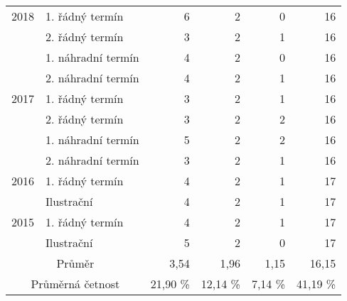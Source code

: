 \begin{table}[htbp]
\begin{tabular}{|l|l|r|r|r|r|}
        \multicolumn{ 1}{|c|}{2018} & 1. řádný termín    & 6 & 2 & 0 & 16 \\ \cline{ 2- 6}
        \multicolumn{ 1}{|l|}{}     & 2. řádný termín    & 3 & 2 & 1 & 16 \\ \cline{ 2- 6}
        \multicolumn{ 1}{|l|}{}     & 1. náhradní termín & 4 & 2 & 0 & 16 \\ \cline{ 2- 6}
        \multicolumn{ 1}{|l|}{}     & 2. náhradní termín & 4 & 2 & 1 & 16 \\ \hline
        \multicolumn{ 1}{|c|}{2017} & 1. řádný termín    & 3 & 2 & 1 & 16 \\ \cline{ 2- 6}
        \multicolumn{ 1}{|l|}{}     & 2. řádný termín    & 3 & 2 & 2 & 16 \\ \cline{ 2- 6}
        \multicolumn{ 1}{|l|}{}     & 1. náhradní termín & 5 & 2 & 2 & 16 \\ \cline{ 2- 6}
        \multicolumn{ 1}{|l|}{}     & 2. náhradní termín & 3 & 2 & 1 & 16 \\ \hline
        \multicolumn{ 1}{|c|}{2016} & 1. řádný termín    & 4 & 2 & 1 & 17 \\ \cline{ 2- 6}
        \multicolumn{ 1}{|l|}{}     & Ilustrační         & 4 & 2 & 1 & 17 \\ \hline
        \multicolumn{ 1}{|c|}{2015} & 1. řádný termín    & 4 & 2 & 1 & 17 \\ \cline{ 2- 6}
        \multicolumn{ 1}{|l|}{}     & Ilustrační         & 5 & 2 & 0 & 17 \\ \hline
        \multicolumn{ 2}{|c|}{Průměr} & 3,54 & 1,96 & 1,15 & 16,15 \\ \hline
        \multicolumn{ 2}{|c|}{Průměrná četnost} & 21,90 \% & 12,14 \% & 7,14 \% & 41,19 \% \\ \hline
    \end{tabular}
    \label{tabulka4-1}
\end{table}

